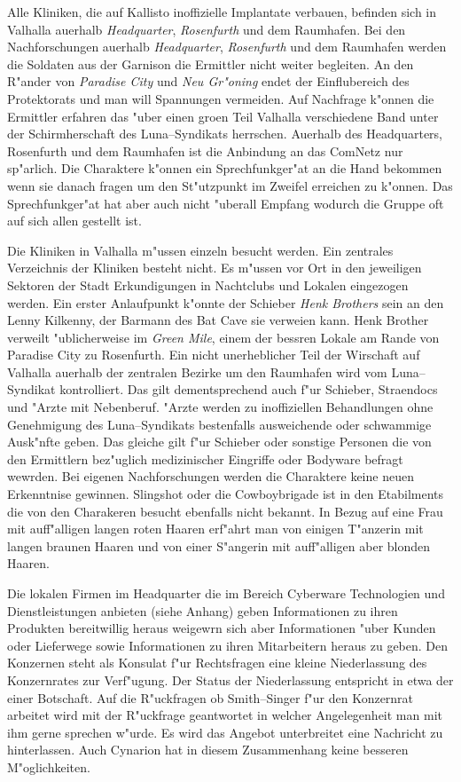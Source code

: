 Alle Kliniken, die auf Kallisto inoffizielle Implantate verbauen, befinden sich in Valhalla au\3erhalb \emph{Headquarter}, \emph{Rosenfurth} und dem Raumhafen. Bei den Nachforschungen au\3erhalb \emph{Headquarter}, \emph{Rosenfurth} und dem Raumhafen werden die Soldaten aus der Garnison die Ermittler nicht weiter begleiten. An den R"ander von \emph{Paradise City} und \emph{Neu Gr"oning} endet der Einflu\3bereich des Protektorats und man will Spannungen vermeiden. Auf Nachfrage k"onnen die Ermittler erfahren das "uber einen gro\3en Teil Valhalla verschiedene Band unter der Schirmherschaft des Luna--Syndikats herrschen. Au\3erhalb des Headquarters, Rosenfurth und dem Raumhafen ist die Anbindung an das ComNetz nur sp"arlich. Die Charaktere k"onnen ein Sprechfunkger"at an die Hand bekommen wenn sie danach fragen um den St"utzpunkt im Zweifel erreichen zu k"onnen. Das Sprechfunkger"at hat aber auch nicht "uberall Empfang wodurch die Gruppe oft auf sich allen gestellt ist.

Die Kliniken in Valhalla m"ussen einzeln besucht werden. Ein zentrales Verzeichnis der Kliniken besteht nicht. Es m"ussen vor Ort in den jeweiligen Sektoren der Stadt Erkundigungen in Nachtclubs und Lokalen eingezogen werden. Ein erster Anlaufpunkt k"onnte der Schieber \emph{Henk Brothers} sein an den Lenny Kilkenny, der Barmann des Bat Cave sie verwei\3en kann. Henk Brother verweilt "ublicherweise im \emph{Green Mile}, einem der bessren Lokale am Rande von Paradise City zu Rosenfurth. Ein nicht unerheblicher Teil der Wirschaft auf Valhalla au\3erhalb der zentralen Bezirke um den Raumhafen wird vom Luna--Syndikat kontrolliert. Das gilt dementsprechend auch f"ur Schieber, Stra\3endocs und "Arzte mit Nebenberuf. "Arzte werden zu inoffiziellen Behandlungen ohne Genehmigung des Luna--Syndikats bestenfalls ausweichende oder schwammige Ausk"nfte geben. Das gleiche gilt f"ur Schieber oder sonstige Personen die von den Ermittlern bez"uglich medizinischer Eingriffe oder Bodyware befragt wewrden. Bei eigenen Nachforschungen werden die Charaktere keine neuen Erkenntnise gewinnen. Slingshot oder die Cowboybrigade ist in den Etabilments die von den Charakeren besucht ebenfalls  nicht bekannt. In Bezug auf eine Frau mit auff"alligen langen roten Haaren erf"ahrt man von einigen T"anzerin mit langen braunen Haaren und von einer S"angerin mit auff"alligen aber blonden Haaren.

Die lokalen Firmen im Headquarter die im Bereich Cyberware Technologien und Dienstleistungen anbieten (siehe Anhang) geben Informationen zu ihren Produkten bereitwillig heraus weigewrn sich aber Informationen "uber Kunden oder Lieferwege sowie Informationen zu ihren Mitarbeitern heraus zu geben. Den Konzernen steht als Konsulat f"ur Rechtsfragen eine kleine Niederlassung des Konzernrates zur Verf"ugung. Der Status der Niederlassung entspricht in etwa der einer Botschaft. Auf die R"uckfragen ob Smith--Singer f"ur den Konzernrat arbeitet wird mit der R"uckfrage geantwortet in welcher Angelegenheit man mit ihm gerne sprechen w"urde. Es wird das Angebot unterbreitet eine Nachricht zu hinterlassen. Auch Cynarion hat in diesem Zusammenhang keine besseren M"oglichkeiten.


